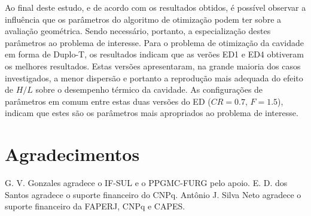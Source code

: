 \documentclass[12pt,A4,A4pt]{article}
\begin{document}
Ao final deste estudo, e de acordo com os resultados obtidos, é possível observar a influência que os parâmetros do algoritmo de otimização podem ter sobre a avaliação geométrica. Sendo necessário, portanto, a especialização destes parâmetros ao problema de interesse. Para o problema de otimização da cavidade em forma de Duplo-T, os resultados indicam que as verões ED1 e ED4 obtiveram os melhores resultados. Estas versões apresentaram, na grande maioria dos casos investigados, a menor dispersão e portanto a reprodução mais adequada do efeito de $H/L$ sobre o desempenho térmico da cavidade. As configurações de parâmetros em comum entre estas duas versões do ED ($CR=0.7$, $F=1.5$), indicam que estes são os parâmetros mais apropriados ao problema de interesse.

\section*{Agradecimentos}
\hspace{0.5cm}G. V. Gonzales agradece o IF-SUL e o  PPGMC-FURG pelo apoio. E. D. dos Santos agradece o suporte financeiro do CNPq. Antônio J. Silva Neto agradece o suporte financeiro da FAPERJ, CNPq e CAPES.



\end{document}
